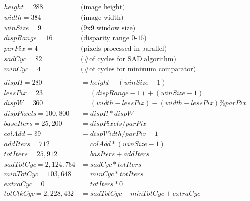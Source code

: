 \begin{subequations}
\begin{align}
	height = 288 	\qquad & \text{(image height)} \label{eq:a}\\
	width = 384 	\qquad & \text{(image width)} \label{eq:b}\\
	winSize = 9	 	\qquad & \text{(9x9 window size)} \label{eq:c}\\
	dispRange = 16 	\qquad & \text{(disparity range 0-15)} \label{eq:d}\\
	parPix = 4 		\qquad & \text{(pixels processed in parallel)} \label{eq:e}\\
	sadCyc = 82		\qquad & \text{(\# of cycles for SAD algorithm)} \label{eq:f}\\
	minCyc = 4		\qquad & \text{(\# of cycles for minimum comparator)} \label{eq:g}\\ 
	\nonumber\\
	dispH = 280 &= height - (winSize - 1) \label{eq:h}\\
	lessPix = 23 &= (dispRange-1) + (winSize-1) \label{eq:i}\\
	dispW = 360 &= (width-lessPix) - (width-lessPix) \% parPix \label{eq:j}\\
	dispPixels = 100,800 &= dispH * dispW \label{eq:k}\\
	baseIters = 25,200 &= dispPixels / parPix \label{eq:l}\\
	colAdd = 89 &= dispWidth / parPix - 1 \label{eq:m}\\
	addIters = 712 &= colAdd * (winSize-1) \label{eq:n}\\
	totIters = 25,912 &= basIters + addIters \label{eq:o}\\
	sadTotCyc = 2,124,784 &= sadCyc * totIters \label{eq:p}\\
	minTotCyc = 103,648 &= minCyc * totIters \label{eq:q}\\
	extraCyc = 0 &= totIters * 0 \label{eq:r}\\
	totClkCyc = 2,228,432 &= sadTotCyc + minTotCyc + extraCyc \label{eq:s}
\end{align}
	\label{eq:clockCycles}
\end{subequations}

